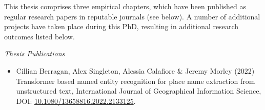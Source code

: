 This thesis comprises three empirical chapters, which have been published as regular research papers in reputable journals (see below). A number of additional projects have taken place during this PhD, resulting in additional research outcomes listed below.

\textit{Thesis Publications}

\begin{itemize}
    \item  Cillian Berragan, Alex Singleton, Alessia Calafiore \& Jeremy Morley (2022) Transformer based named entity recognition for place name extraction from unstructured text, International Journal of Geographical Information Science, DOI: \href{10.1080/13658816.2022.2133125}{10.1080/13658816.2022.2133125}.
\end{itemize}
